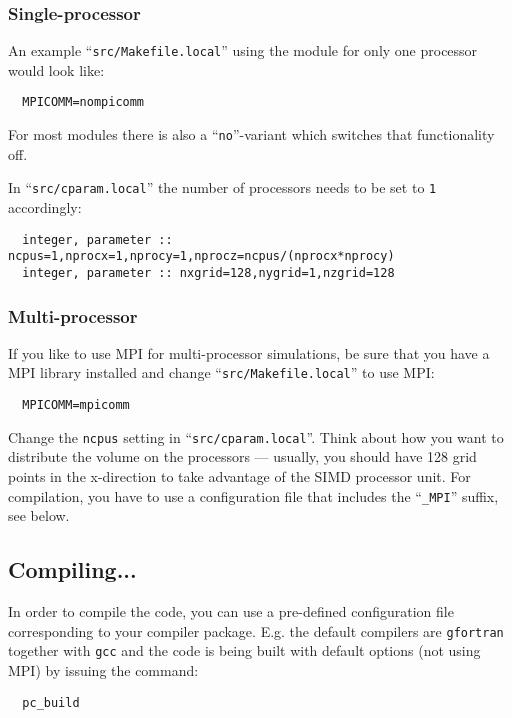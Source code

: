 \documentclass[a4paper,12pt]{article}
\newcommand{\command}[1]{\texttt{#1}}
\newcommand{\file}[1]{``\texttt{#1}''}
\newcommand{\name}[1]{\textsc{#1}}
\newcommand{\code}[1]{\texttt{#1}}
\begin{document}
\subsubsection{Single-processor}
An example \file{src/Makefile.local} using the module for only one processor would look like:
\begin{verbatim}
  MPICOMM=nompicomm
\end{verbatim}

For most modules there is also a \file{no}-variant which switches that functionality off.

In \file{src/cparam.local} the number of processors needs to be set to \code{1} accordingly:
\begin{verbatim}
  integer, parameter :: ncpus=1,nprocx=1,nprocy=1,nprocz=ncpus/(nprocx*nprocy)
  integer, parameter :: nxgrid=128,nygrid=1,nzgrid=128
\end{verbatim}

\subsubsection{Multi-processor}
If you like to use \name{MPI} for multi-processor simulations, be sure that you have a \name{MPI} library installed and change \file{src/Makefile.local} to use \name{MPI}:
\begin{verbatim}
  MPICOMM=mpicomm
\end{verbatim}

Change the \code{ncpus} setting in \file{src/cparam.local}.
Think about how you want to distribute the volume on the processors --- usually, you should have 128 grid points in the x-direction to take advantage of the SIMD processor unit.
For compilation, you have to use a configuration file that includes the \file{\_MPI} suffix, see below.

\subsection{Compiling...}

In order to compile the code, you can use a pre-defined configuration file corresponding to your compiler package.
E.g. the default compilers are \command{gfortran} together with \command{gcc} and the code is being built with default options (not using \name{MPI}) by issuing the command:

\begin{verbatim}
  pc_build
\end{verbatim}
\end{document}
